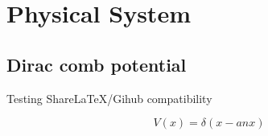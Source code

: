 \chapter{Physical System}\label{ch:system}


\section{Dirac comb potential}

Testing Share\LaTeX{}/Gihub compatibility


\begin{equation} %
	V(x) = \delta(x-anx)
\end{equation}





